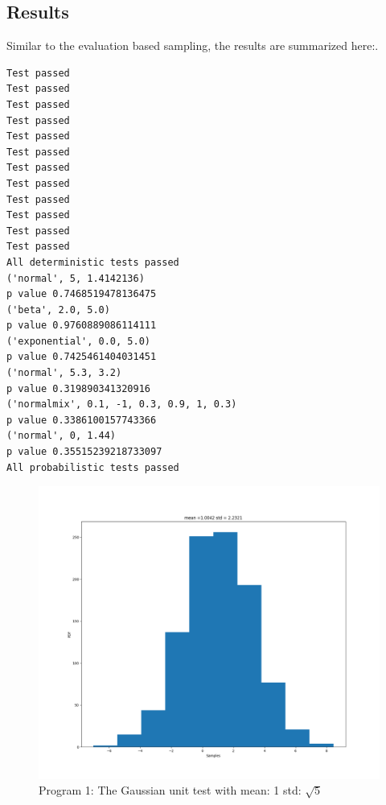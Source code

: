 \documentclass[]{article}
\begin{document}
\subsection{Results}
Similar to the evaluation based sampling, the results are summarized here:.
\begin{verbatim}
Test passed
Test passed
Test passed
Test passed
Test passed
Test passed
Test passed
Test passed
Test passed
Test passed
Test passed
Test passed
All deterministic tests passed
('normal', 5, 1.4142136)
p value 0.7468519478136475
('beta', 2.0, 5.0)
p value 0.9760889086114111
('exponential', 0.0, 5.0)
p value 0.7425461404031451
('normal', 5.3, 3.2)
p value 0.319890341320916
('normalmix', 0.1, -1, 0.3, 0.9, 1, 0.3)
p value 0.3386100157743366
('normal', 0, 1.44)
p value 0.35515239218733097
All probabilistic tests passed
\end{verbatim}
\newpage
\begin{figure}[h]
	\begin{center}
		\includegraphics[width=\textwidth]{Graph/GaussianUnitTest.png}
		\caption{Program 1: The Gaussian unit test with mean: 1 std: $\sqrt{5}$}
	\end{center}
\end{figure}
\end{document}
